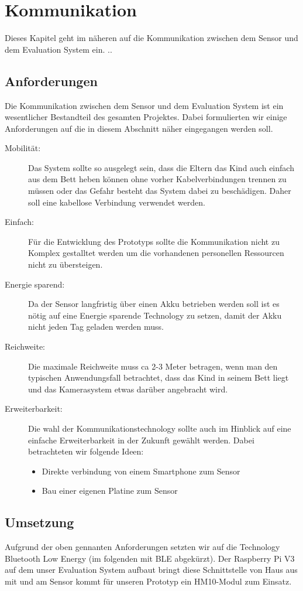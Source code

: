 \section{Kommunikation}
\label{sec:com}

Dieses Kapitel geht im näheren auf die Kommunikation zwischen dem Sensor und dem Evaluation System ein. 
..

\subsection{Anforderungen}

Die Kommunikation zwischen dem Sensor und dem Evaluation System ist ein wesentlicher Bestandteil des gesamten Projektes. Dabei formulierten wir einige Anforderungen auf die in diesem Abschnitt näher eingegangen werden soll. 

\begin{description}
  \item[Mobilität:]
  Das System sollte so ausgelegt sein, dass die Eltern das Kind auch einfach aus dem Bett heben können ohne vorher Kabelverbindungen trennen zu müssen oder das Gefahr besteht das System dabei zu beschädigen. Daher soll eine kabellose Verbindung verwendet werden.
  
  \item[Einfach:]
  Für die Entwicklung des Prototyps sollte die Kommunikation nicht zu Komplex gestalltet werden um die vorhandenen personellen Ressourcen nicht zu übersteigen. 
  
  \item[Energie sparend:]
  Da der Sensor langfristig über einen Akku betrieben werden soll ist es nötig auf eine Energie sparende Technology zu setzen, damit der Akku nicht jeden Tag geladen werden muss.
  
  \item[Reichweite:]
  Die maximale Reichweite muss ca 2-3 Meter betragen, wenn man den typischen Anwendungsfall betrachtet, dass das Kind in seinem Bett liegt und das Kamerasystem etwas darüber angebracht wird.
  
  \item[Erweiterbarkeit:]
  Die wahl der Kommunikationstechnology sollte auch im Hinblick auf eine einfache Erweiterbarkeit in der Zukunft gewählt werden. Dabei betrachteten wir folgende Ideen:
  \begin{itemize}
    \item Direkte verbindung von einem Smartphone zum Sensor
    \item Bau einer eigenen Platine zum Sensor 
  \end{itemize}
   
\end{description}

\subsection{Umsetzung}
Aufgrund der oben gennanten Anforderungen setzten wir auf die Technology Bluetooth Low Energy (im folgenden mit BLE abgekürzt). Der Raspberry Pi V3 auf dem unser Evaluation System aufbaut bringt diese Schnittstelle von Haus aus mit und am Sensor kommt für unseren Prototyp ein HM10-Modul zum Einsatz. 



